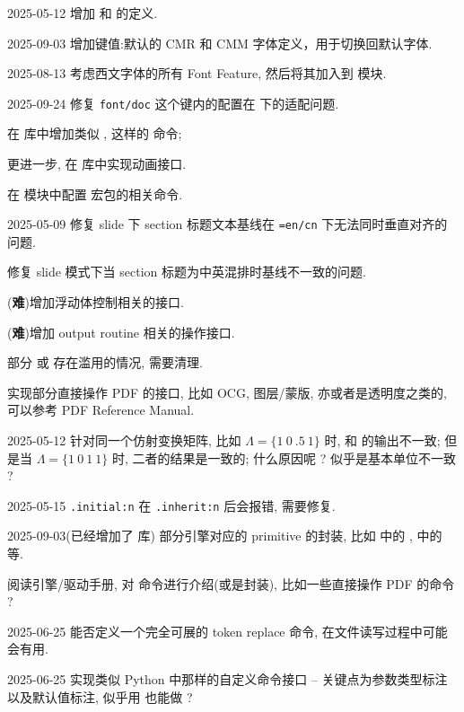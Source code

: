\begin{todolist}
  \item [2025-05-12] 增加  和  的定义.
  \item [2025-09-03] 增加键值:默认的 CMR 和 CMM 字体定义，用于切换回默认字体.
  \item [2025-08-13] 考虑西文字体的所有 Font Feature, 然后将其加入到  模块.
  \item [2025-09-24] 修复 \texttt{font/doc} 这个键内的配置在  下的适配问题.
  \item 在  库中增加类似 ,  这样的  命令; 
  \item*[此需求不适合 \ztex{}] 更进一步, 在  库中实现动画接口.
  \item 在  模块中配置  宏包的相关命令.
  \item [2025-05-09] 修复 slide 下 section 标题文本基线在 \texttt{=en/cn} 下无法同时垂直对齐的问题. 
  \item*[此为中英文字体本身的问题] 修复 slide 模式下当 section 标题为中英混排时基线不一致的问题.
  \item (\textbf{难})增加浮动体控制相关的接口.
  \item (\textbf{难})增加 output routine 相关的操作接口.
  \item 部分  或  存在滥用的情况, 需要清理.
  \item 实现部分直接操作 PDF 的接口, 比如 OCG, 图层/蒙版, 亦或者是透明度之类的, 可以参考 PDF Reference Manual. 
  \item [2025-05-12] 针对同一个仿射变换矩阵, 比如 $\Lambda=\{1\ 0\ .5\ 1\}$ 时,  和  的输出不一致; 但是当 $\Lambda=\{1\ 0\ 1\ 1\}$ 时, 二者的结果是一致的; 什么原因呢 ? 似乎是基本单位不一致 ? 
  \item [2025-05-15] \texttt{.initial:n} 在 \texttt{.inherit:n} 后会报错, 需要修复.
  \item [2025-09-03(已经增加了 \pkg{primitive} 库)] 部分引擎对应的 primitive 的封装, 比如  中的 \cmd{\pdfsetmatrix},  中的 \cmd{\ifprimitive} 等.
  \item 阅读引擎/驱动手册, 对 \cmd{\special} 命令进行介绍(或是封装), 比如一些直接操作 PDF 的命令 ?
  \item [2025-06-25] 能否定义一个完全可展的 token replace 命令, 在文件读写过程中可能会有用.
  \item [2025-06-25] 实现类似 Python 中那样的自定义命令接口 -- 关键点为参数类型标注以及默认值标注, 似乎用  也能做 ?

\end{todolist}
